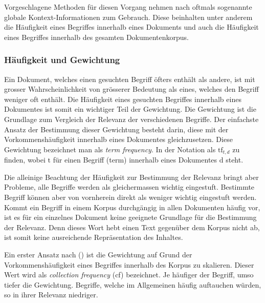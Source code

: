Vorgeschlagene Methoden für diesen Vorgang nehmen nach \cite[S.~85]{Zhang2006} oftmals sogenannte globale Kontext-Informationen zum Gebrauch. Diese beinhalten unter anderem die Häufigkeit eines Begriffes innerhalb eines Dokuments und auch die Häufigkeit eines Begriffes innerhalb des gesamten Dokumentenkorpus. %



\subsubsection{Häufigkeit und Gewichtung}\label{gewichtung}


Ein Dokument, welches einen gesuchten Begriff öfters enthält als andere, ist mit grosser Wahrscheinlichkeit von grösserer Bedeutung als eines, welches den Begriff weniger oft enthält. Die Häufigkeit eines gesuchten Begriffes innerhalb eines Dokumentes ist somit ein wichtiger Teil der Gewichtung. Die Gewichtung ist die Grundlage zum Vergleich der Relevanz der verschiedenen Begriffe. Der einfachste Ansatz der Bestimmung dieser Gewichtung besteht darin, diese mit der Vorkommenshäufigkeit innerhalb eines Dokumentes gleichzusetzen. Diese Gewichtung bezeichnet man als \textit{term frequency}. In der Notation als $\text{tf}_{t,d}$ zu finden, wobei $\text{t}$ für einen Begriff (term) innerhalb eines Dokumentes $\text{d}$ steht.

Die alleinige Beachtung der Häufigkeit zur Bestimmung der Relevanz bringt aber Probleme, alle Begriffe werden als gleichermassen wichtig eingestuft. Bestimmte Begriff können aber von vornherein direkt als weniger wichtig eingestuft werden. Kommt ein Begriff in einem Korpus durchgängig in allen Dokumenten häufig vor, ist es für ein einzelnes Dokument keine geeignete Grundlage für die Bestimmung der Relevanz. Denn dieses Wort hebt einen Text gegenüber dem Korpus nicht ab, ist somit keine ausreichende Repräsentation des Inhaltes.

Ein erster Ansatz nach (\cite{manning2008introduction}) ist die Gewichtung auf Grund der Vorkommenshäufigkeit eines Begriffes innerhalb des Korpus zu skalieren. Dieser Wert wird als \textit{collection frequency} (cf) bezeichnet. Je häuf\-iger der Begriff, umso tiefer die Gewichtung. Begriffe, welche im Allgemeinen häufig auftauchen würden, so in ihrer Relevanz niedriger. 

